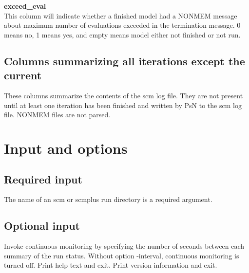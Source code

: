 \documentclass[hideglossary,notoc,hidelof,hidelot,hideTheSignaturePage,hideLinkCurrent,hideloa,pdfLatex,noClient,notitle,hideConfidential]{PMXstyle-20190820}
\begin{document}
{\bfseries exceed\_eval}\\
This column will indicate whether a finished model had a NONMEM message about maximum number
of evaluations exceeded in the termination message. 0 means no, 1 means yes, and empty means
model either not finished or not run.

\subsection{Columns summarizing all iterations except the current}
These columns summarize the contents of the scm log file. 
They are not present until at least one iteration has been finished and written by PsN
to the scm log file.
NONMEM files are not parsed.



\section{Input and options}

\subsection{Required input}
The name of an scm or scmplus run directory is a required argument.

\subsection{Optional input}

\begin{optionlist}
Invoke continuous monitoring by specifying the number of seconds
between each summary of the run status.
Without option -interval, continuous monitoring is turned off.
\nextopt
{}
Print help text and exit.
\nextopt
{}
Print version information and exit.
\nextopt
\end{optionlist}
\end{document}
